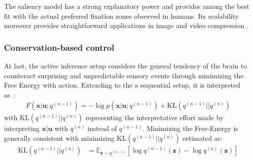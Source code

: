 \documentclass[12pt,twoside,openright]{article}
\begin{document}
The saliency model has a strong explanatory power and provides among the best fit with the actual preferred fixation zones observed in humans.
Its scalability moreover provides straightforward applications in image and video compression  \cite{wang2003foveation,guo2010novel}.

\subsubsection{Conservation-based control}

At last, the  active inference setup \cite{friston2010free,friston2012perceptions} 
considers the general tendency of the brain to counteract surprising and unpredictable sensory events through minimizing the Free Energy with action. Extending \cite{friston2015active} to the a sequential setup, it is interpreted as~:
\begin{align}
F(\boldsymbol{x}|\boldsymbol{u}; q^{(n-1)}) = 
-\log p(\boldsymbol{x}| \boldsymbol{u}; q^{(n-1)}) + \text{KL}(q^{(n-1)}||q^{(n)})
\label{eq:ELBO}
\end{align}
with $\text{KL}(q^{(n-1)}||q^{(n)})$ representing the interpretative effort made by interpreting  $\boldsymbol{x}|\boldsymbol{u}$ with $q^{(n)}$ instead of $q^{(n-1)}$.
Minimizing the Free-Energy is generally consistent with minimizing $\text{KL}(q^{(n-1)}||q^{(n)})$
estimated as:
\begin{align*}
\text{KL}(q^{(n-1)}||q^{(n)})
&= \mathbb{E}_{\boldsymbol{z} \sim q^{(n-1)}} \left[\log q^{(n-1)}(\boldsymbol{z}) - \log q^{(n)}(\boldsymbol{z})\right]
\end{align*}
\end{document}
